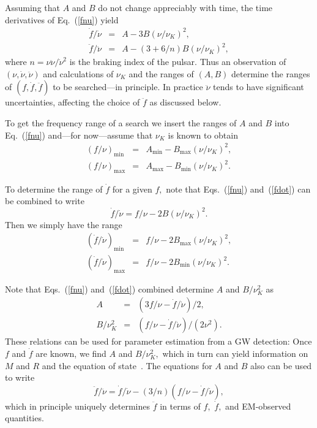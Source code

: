 \documentclass{ttuthes2007}
\begin{document}
Assuming that $A$ and $B$ do not change appreciably with time, the time
derivatives of Eq.~(\ref{fnu}) yield
\begin{eqnarray}
\label{fdot}
\dot f / \dot \nu &=& A - 3B \left( \nu/\nu_K \right)^2,
\\
\label{fddot}
\ddot f / \ddot \nu &=& A - \left( 3 + 6/n \right) B \left( \nu/\nu_K
\right)^2,
\end{eqnarray}
where $n = \nu \ddot \nu / \dot \nu^2$ is the braking index of the pulsar.
Thus an observation of $(\nu, \dot\nu, \ddot\nu)$ and calculations of $\nu_K$
and the ranges of $(A,B)$ determine the ranges of $(f, \dot f, \ddot f)$ to be
searched---in principle.
In practice $\ddot\nu$ tends to have significant uncertainties, affecting the
choice of $\ddot f$ as discussed below.

To get the frequency range of a search we insert the ranges of $A$ and $B$
into Eq.~(\ref{fnu}) and---for now---assume that $\nu_K$ is known to obtain
\begin{eqnarray}
(f/\nu)_{\min} &=& A_{\min} - B_{\max} \left( \nu/\nu_K \right)^2,
\\
(f/\nu)_{\max} &=& A_{\max} - B_{\min} \left( \nu/\nu_K \right)^2.
\end{eqnarray}

To determine the range of $\dot{f}$ for a given $f,$ note that
Eqs.~(\ref{fnu}) and~(\ref{fdot}) can be combined to write
\begin{equation}
\dot f / \dot \nu = f / \nu - 2B \left( \nu/\nu_K \right)^2.
\end{equation}
Then we simply have the range
\begin{eqnarray}
\left( \dot{f} / \dot\nu \right)_{\min} &=& f / \nu - 2B_{\max} \left(
\nu/\nu_K \right)^2,
\\
\left( \dot{f} / \dot\nu \right)_{\max} &=& f / \nu - 2B_{\min} \left(
\nu/\nu_K \right)^2.
\end{eqnarray}

Note that Eqs.~(\ref{fnu}) and~(\ref{fdot}) combined determine $A$ and
$B/\nu_K^2$ as
\begin{eqnarray}
A &=& \left( 3f / \nu - \dot{f} / \dot{\nu} \right) /2,
\\
B/\nu_K^2 &=& \left( f / \nu - \dot{f} / \dot{\nu} \right) / \left( 2\nu^2
\right).
\end{eqnarray}
These relations can be used for parameter estimation from a \ac{GW} detection:
Once $f$ and $\dot f$ are known, we find $A$ and $B/\nu_K^2,$ which in turn
can yield information on $M$ and $R$ and the equation of
state~\cite{Yoshida:2004gk, Idrisy:2014qca}.
The equations for $A$ and $B$ also can be used to write
\begin{equation}
\ddot{f} / \ddot{\nu} = \dot{f} / \dot{\nu} - (3/n) \left( f / \nu - \dot{f} /
\dot{\nu} \right),
\end{equation}
which in principle uniquely determines $\ddot f$ in terms of $f,$ $\dot f,$
and \ac{EM}-observed quantities.
\end{document}
